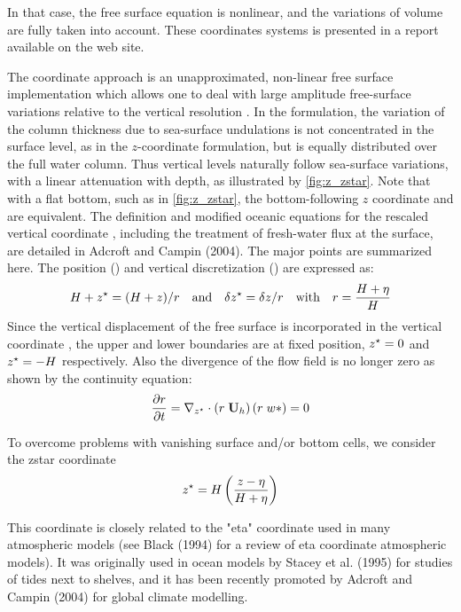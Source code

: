 \documentclass[../main/NEMO_manual]{subfiles}
\begin{document}
In that case, the free surface equation is nonlinear, and the variations of volume are fully taken into account.
These coordinates systems is presented in a report \citep{Levier2007} available on the \NEMO web site.

The \zstar coordinate approach is an unapproximated, non-linear free surface implementation which allows one to
deal with large amplitude free-surface variations relative to the vertical resolution \citep{Adcroft_Campin_OM04}.
In the \zstar formulation,
the variation of the column thickness due to sea-surface undulations is not concentrated in the surface level,
as in the $z$-coordinate formulation, but is equally distributed over the full water column.
Thus vertical levels naturally follow sea-surface variations, with a linear attenuation with depth,
as illustrated by \autoref{fig:z_zstar}.
Note that with a flat bottom, such as in \autoref{fig:z_zstar}, the bottom-following $z$ coordinate and \zstar are equivalent.
The definition and modified oceanic equations for the rescaled vertical coordinate \zstar,
including the treatment of fresh-water flux at the surface, are detailed in Adcroft and Campin (2004).
The major points are summarized here.
The position (\zstar) and vertical discretization (\zstar) are expressed as:
\[
  H + \zstar = (H + z)  / r \quad \text{and}  \quad \delta \zstar
              = \delta z / r \quad \text{with} \quad r
              = \frac{H + \eta}{H}
\]
Since the vertical displacement of the free surface is incorporated in the vertical coordinate \zstar,
the upper and lower boundaries are at fixed  \zstar position,
$\zstar = 0$ and $\zstar = -H$ respectively.
Also the divergence of the flow field is no longer zero as shown by the continuity equation:
\[
  \pd[r]{t} = \nabla_{\zstar} \cdot \lt( r \; \vect U_h \rt) (r \; w *) = 0
\]

To overcome problems with vanishing surface and/or bottom cells, we consider the zstar coordinate 
\[
  \zstar = H \lt( \frac{z - \eta}{H + \eta} \rt)
\]

This coordinate is closely related to the "eta" coordinate used in many atmospheric models
(see Black (1994) for a review of eta coordinate atmospheric models).
It was originally used in ocean models by Stacey et al. (1995) for studies of tides next to shelves,
and it has been recently promoted by Adcroft and Campin (2004) for global climate modelling.
\end{document}
